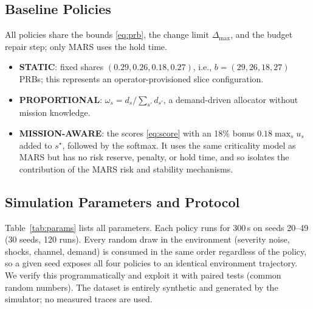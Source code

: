 \documentclass[conference]{IEEEtran}
\begin{document}
\subsection{Baseline Policies}
All policies share the bounds \eqref{eq:prb}, the change limit $\Delta_{\max}$, and the budget repair step; only MARS uses the hold time.
\begin{itemize}
\item \textbf{STATIC}: fixed shares $(0.29,0.26,0.18,0.27)$, i.e., $b=(29,26,18,27)$ PRBs; this represents an operator-provisioned slice configuration.
\item \textbf{PROPORTIONAL}: $\omega_s=d_s/\sum_{s'}d_{s'}$, a demand-driven allocator without mission knowledge.
\item \textbf{MISSION-AWARE}: the scores \eqref{eq:score} with an 18\% bonus $0.18\max_s u_s$ added to $s^\star$, followed by the softmax. It uses the same criticality model as MARS but has no risk reserve, penalty, or hold time, and so isolates the contribution of the MARS risk and stability mechanisms.
\end{itemize}

\subsection{Simulation Parameters and Protocol}
Table~\ref{tab:params} lists all parameters. Each policy runs for 300\,s on seeds 20--49 (30 seeds, 120 runs). Every random draw in the environment (severity noise, shocks, channel, demand) is consumed in the same order regardless of the policy, so a given seed exposes all four policies to an identical environment trajectory. We verify this programmatically and exploit it with paired tests (common random numbers). The dataset is entirely synthetic and generated by the simulator; no measured traces are used.
\end{document}
